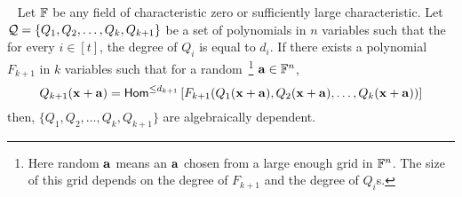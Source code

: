 \begin{lemma}~\label{lem:using algebraic dependence-converse}
Let $\mathbb{F}$ be any  field of characteristic zero or sufficiently large characteristic. Let ${\cal Q} = \{Q_1, Q_2, \ldots, Q_k, Q_{k+1}\}$ be a set of polynomials in $n$ variables such that the for every $i \in [t]$, the degree of  $Q_i$ is equal to $d_i$. 
If there exists a polynomial $F_{k+1}$  in $k$ variables such that for a random~\footnote{Here random $\mathbf{a}$ means an $\mathbf{a}$ chosen from a large enough grid in $\mathbb{F}^n$. The size of this grid depends on the degree of $F_{k+1}$ and the degree of $Q_i$s. } $\mathbf{a} \in \mathbb{F}^{n}$,  
$$Q_{k+1}(\mathbf{x} + \mathbf{a}) = \mathsf{Hom}^{\leq d_{k+1}}\left[F_{k+1}(Q_1(\mathbf{x} + \mathbf{a}), Q_2(\mathbf{x} + \mathbf{a}), \ldots, Q_k(\mathbf{x} + \mathbf{a})) \right] $$
then, $\{Q_1, Q_2, \ldots, Q_k, Q_{k+1}\}$ are algebraically dependent. 
\end{lemma}
